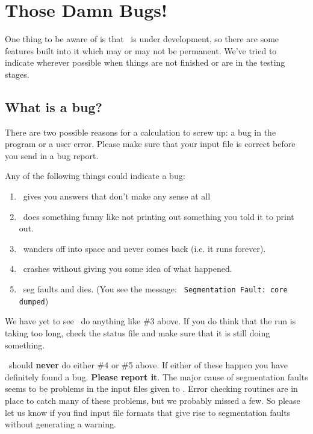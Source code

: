 \chapter{Those Damn Bugs!}

One thing to be aware of is that \prog\ is under development, so there
are some features built into it which may or may not be permanent.
We've tried to indicate wherever possible when things are not finished
or are in the testing stages.


\section{What is a bug?}

There are two possible reasons for a calculation to screw up: a bug in
the program or a user error.  Please make sure that your input file is
correct before you send in a bug report.

Any of the following things could indicate a
bug:

\begin{enumerate}

\item \calcprog\ gives you answers that don't make any sense at all

\item \calcprog\ does something funny like not printing out something
you told it to print out.

\item \calcprog\ wanders off into space and never comes back (i.e. it
runs forever).

\item \calcprog\ crashes without giving you some idea of what
happened.

\item \calcprog\ seg faults and dies. (You see the message: {\tt
Segmentation Fault: core dumped})

\end{enumerate}

We have yet to see \calcprog\ do anything like \#3 above.  If you do
think that the run is taking too long, check the status file and make
sure that it is still doing something.

\calcprog\ should {\bf never} do either \#4 or \#5 above.  If either
of these happen you have definitely found a bug.  {\bf Please report it}.
The major cause of segmentation faults seems to be problems in the
input files given to \calcprog. Error checking routines are in place to
catch many of these problems, but we probably missed a
few.  So please let us know if you find input file formats that give
rise to segmentation faults without generating a warning.


